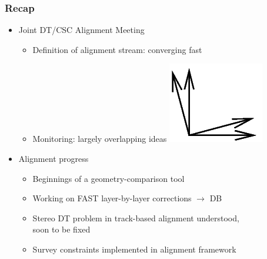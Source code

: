 \documentclass[compress]{beamer}
\begin{document}
\begin{frame}
\frametitle{Recap}
\begin{itemize}\setlength{\itemsep}{0.5 cm}
\item Joint DT/CSC Alignment Meeting

\vspace{0.125 cm}
\begin{itemize}\setlength{\itemsep}{0.125 cm}
\item Definition of alignment stream: converging fast
\item Monitoring: largely overlapping ideas \includegraphics[width=0.5 cm]{overlap.png}
\end{itemize}

\item Alignment progress

\vspace{0.125 cm}
\begin{itemize}\setlength{\itemsep}{0.125 cm}
\item Beginnings of a geometry-comparison tool
\item Working on FAST layer-by-layer corrections $\to$ DB
\item Stereo DT problem in track-based alignment understood, \\ soon to be fixed
\item Survey constraints implemented in alignment framework
\end{itemize}
\end{itemize}
\label{numpages}
\vfill
\end{frame}
\end{document}
